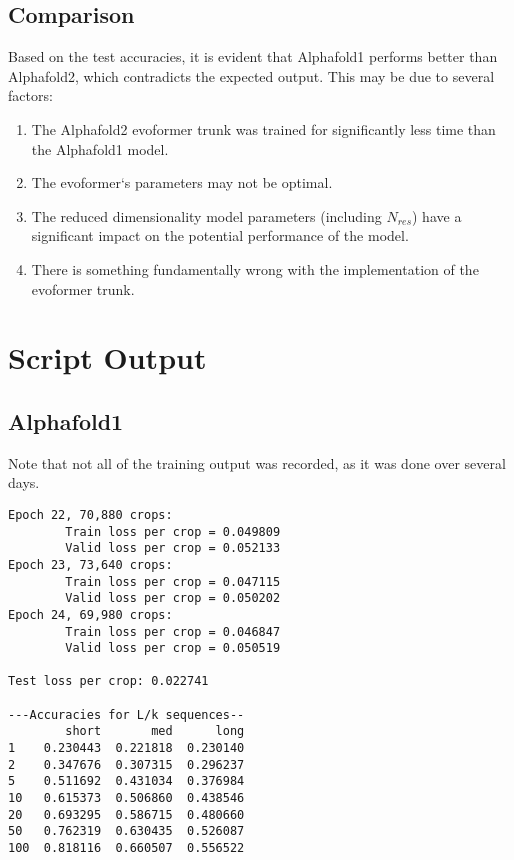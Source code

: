 \documentclass[11pt]{article}
\newcommand{\np}{\newpage}
\begin{document}
\subsection{Comparison}
Based on the test accuracies, it is evident that Alphafold1 performs better than Alphafold2, which contradicts the expected output.  This may be due to several factors:
\begin{enumerate}[label=(\arabic*)]
	\item The Alphafold2 evoformer trunk was trained for significantly less time than the Alphafold1 model.
	\item The evoformer`s parameters may not be optimal.
	\item The reduced dimensionality model parameters (including $N_{res}$) have a significant impact on the potential performance of the model.
	\item There is something fundamentally wrong with the implementation of the evoformer trunk.
\end{enumerate}
\np

\section{Script Output}
\subsection{Alphafold1}
Note that not all of the training output was recorded, as it was done over several days.

\begin{lstlisting}
Epoch 22, 70,880 crops:
        Train loss per crop = 0.049809
        Valid loss per crop = 0.052133
Epoch 23, 73,640 crops:
        Train loss per crop = 0.047115
        Valid loss per crop = 0.050202
Epoch 24, 69,980 crops:
        Train loss per crop = 0.046847
        Valid loss per crop = 0.050519

Test loss per crop: 0.022741

---Accuracies for L/k sequences--
        short       med      long
1    0.230443  0.221818  0.230140
2    0.347676  0.307315  0.296237
5    0.511692  0.431034  0.376984
10   0.615373  0.506860  0.438546
20   0.693295  0.586715  0.480660
50   0.762319  0.630435  0.526087
100  0.818116  0.660507  0.556522
\end{lstlisting}
\end{document}
